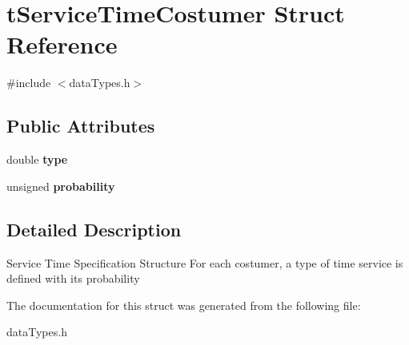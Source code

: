 \hypertarget{structt_service_time_costumer}{
\section{tServiceTimeCostumer Struct Reference}
\label{structt_service_time_costumer}
}


{\ttfamily \#include $<$dataTypes.h$>$}

\subsection*{Public Attributes}
\begin{DoxyCompactItemize}
\item 
\hypertarget{structt_service_time_costumer_aae31c7a47e1f35c4fd750b49aafcc495}{
double {\bfseries type}}
\label{structt_service_time_costumer_aae31c7a47e1f35c4fd750b49aafcc495}

\item 
\hypertarget{structt_service_time_costumer_aaf6e6ed7fa3c8741675925fd44a76ea8}{
unsigned {\bfseries probability}}
\label{structt_service_time_costumer_aaf6e6ed7fa3c8741675925fd44a76ea8}

\end{DoxyCompactItemize}


\subsection{Detailed Description}
Service Time Specification Structure For each costumer, a type of time service is defined with its probability 

The documentation for this struct was generated from the following file:\begin{DoxyCompactItemize}
\item 
dataTypes.h\end{DoxyCompactItemize}
